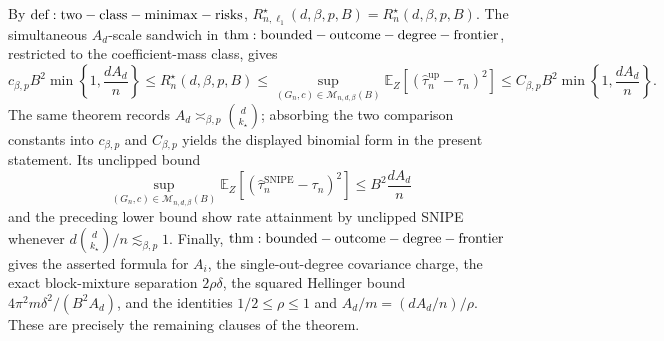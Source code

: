 By \({\rm def:two-class-minimax-risks}\), \(R_{n,\ell_1}^\star(d,\beta,p,B)=R_n^\star(d,\beta,p,B)\). The simultaneous \(A_d\)-scale sandwich in \({\rm thm:bounded-outcome-degree-frontier}\), restricted to the coefficient-mass class, gives
\[
c_{\beta,p}B^2\min\!\left\{1,\frac{dA_d}{n}\right\}
\le R_n^\star(d,\beta,p,B)
\le \sup_{(G_n,c)\in\mathcal M_{n,d,\beta}(B)}
\mathbb E_Z[(\widehat\tau_n^{\mathrm{up}}-\tau_n)^2]
\le C_{\beta,p}B^2\min\!\left\{1,\frac{dA_d}{n}\right\}.
\]
The same theorem records \(A_d\asymp_{\beta,p}\binom d{k_\star}\); absorbing the two comparison constants into \(c_{\beta,p}\) and \(C_{\beta,p}\) yields the displayed binomial form in the present statement. Its unclipped bound
\[
\sup_{(G_n,c)\in\mathcal M_{n,d,\beta}(B)}
\mathbb E_Z[(\widehat\tau_n^{\mathrm{SNIPE}}-\tau_n)^2]
\le B^2\frac{dA_d}{n}
\]
and the preceding lower bound show rate attainment by unclipped SNIPE whenever \(d\binom d{k_\star}/n\lesssim_{\beta,p}1\). Finally, \({\rm thm:bounded-outcome-degree-frontier}\) gives the asserted formula for \(A_i\), the single-out-degree covariance charge, the exact block-mixture separation \(2\rho\delta\), the squared Hellinger bound \(4\pi^2m\delta^2/(B^2A_d)\), and the identities \(1/2\le\rho\le1\) and \(A_d/m=(dA_d/n)/\rho\). These are precisely the remaining clauses of the theorem.